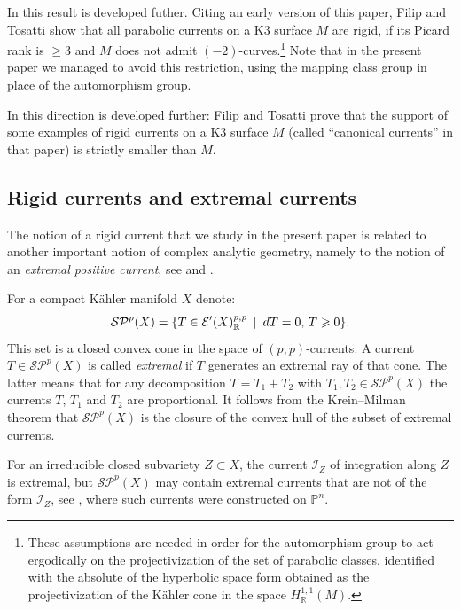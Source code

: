 \documentclass[11pt]{article}
\newcommand{\6}{\partial}
\newcommand{\bbR}{\mathbb{R}}
\newcommand{\bbP}{\mathbb{P}}
\newcommand{\EE}{\mathcal{E}}
\newcommand{\II}{\mathcal{I}}
\renewcommand{\ge}{\geqslant}
\newcommand{\st}{\enskip |\enskip}
\begin{document}
In \cite{_Filip_Tosatti:canonical_} this result
is developed futher. Citing an early
version of this paper, Filip and Tosatti
show that all parabolic currents on a K3 surface $M$
are rigid, if its Picard rank is $\ge 3$
and $M$ does not admit $(-2)$-curves.\footnote{
These assumptions are  needed in order for the automorphism
group to act ergodically on the projectivization of the set
of parabolic classes, identified with the absolute of the
hyperbolic space form obtained as the projectivization
of the K\"ahler cone in the space
$H^{1,1}_\bbR(M)$.} 
Note that in the present paper we managed to
avoid this restriction, using the mapping
class group in place of the automorphism group.

In \cite{_Filip_Tosatti:gaps_}
this direction is developed further:
Filip and Tosatti prove that the support of 
some examples of rigid currents on a K3 surface $M$ 
(called ``canonical currents'' in that paper) is strictly smaller than $M$.

\subsection{Rigid currents and extremal currents}

The notion of a rigid current that we study in the present paper is
related to another important notion of complex analytic geometry,
namely to the notion of an {\it extremal positive current}, see \cite{Le} and \cite{De1}.

For a compact K\"ahler manifold $X$ denote:
$$
\mathcal{SP}^{p}(X) = \{T\in \EE'(X)^{p,p}_\bbR\st dT=0,\, T\ge 0\}.
$$
This set is a closed convex cone in the space of $(p,p)$-currents.
A current $T\in\mathcal{SP}^p(X)$ is called {\it extremal} if
$T$ generates an extremal ray of that cone. The latter means that
for any decomposition $T = T_1+T_2$ with $T_1,T_2 \in \mathcal{SP}^p(X)$
the currents $T$, $T_1$ and $T_2$ are proportional. It follows from
the Krein--Milman theorem that $\mathcal{SP}^p(X)$ is the closure
of the convex hull of the subset of extremal currents.

For an irreducible closed subvariety $Z\subset X$, the current $\II_Z$
of integration along $Z$ is extremal, but $\mathcal{SP}^p(X)$
may contain extremal currents that are not of the form $\II_Z$,
see \cite[Th\'eor\`eme 4.1]{De1}, where such currents were constructed on $\bbP^n$.
\end{document}
